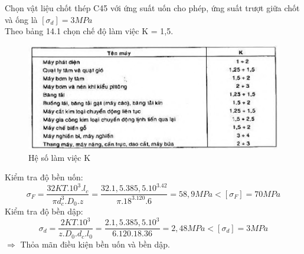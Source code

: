 Chọn vật liệu chốt thép C45 với ứng suất uốn cho phép, ứng suất trượt giữa chốt 
và ống là $[\sigma_d] =3MPa$ \\
Theo bảng 14.1 chọn chế độ làm việc K = 1,5.
\begin{figure}[H]
    \centering
    \includegraphics[width=1\textwidth]{pictures/hesolamviec.png}
    \caption{Hệ số làm việc K}
\end{figure}

Kiểm tra độ bền uốn:
\[
    \sigma_F = \frac{32KT.10^3.l_c}{\pi d_c^3.D_0.z} = \frac{32.1,5.385,5.10^3.42}{\pi.18^3.120.6} = 58,9MPa < [\sigma_F] = 70MPa
\]
\hspace*{0,82cm}Kiểm tra độ bền dập:
\[
    \sigma_d = \frac{2KT.10^3}{z.D_0.d_c.l_0}  = \frac{2.1,5.385,5.10^3}{6.120.18.36} = 2,48MPa < [\sigma_d] = 3MPa
\]
$\Rightarrow$ Thỏa mãn điều kiện bền uốn và bền dập.
\cleardoublepage